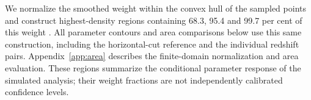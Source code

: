 We normalize the smoothed weight within the convex hull of the sampled points and construct highest-density regions containing 68.3, 95.4 and 99.7 per cent of this weight \citep{Hyndman1996HDR}. All parameter contours and area comparisons below use this same construction, including the horizontal-cut reference and the individual redshift pairs. Appendix~\ref{app:area} describes the finite-domain normalization and area evaluation. These regions summarize the conditional parameter response of the simulated analysis; their weight fractions are not independently calibrated confidence levels.
